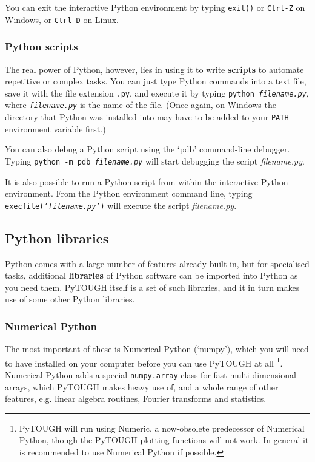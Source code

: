 You can exit the interactive Python environment by typing \texttt{exit()} or \texttt{Ctrl-Z} on Windows, or \texttt{Ctrl-D} on Linux.

\subsubsection{Python scripts}

The real power of Python, however, lies in using it to write \textbf{scripts} to automate repetitive or complex tasks.  You can just type Python commands into a text file, save it with the file extension \texttt{.py}, and execute it by typing \texttt{python \emph{filename.py}}, where \texttt{\emph{filename.py}} is the name of the file.  (Once again, on Windows the directory that Python was installed into may have to be added to your \texttt{PATH} environment variable first.)

You can also debug a Python script using the `pdb' command-line debugger.  Typing \texttt{python -m pdb \emph{filename.py}} will start debugging the script \emph{filename.py}.

It is also possible to run a Python script from within the interactive Python environment.  From the Python environment command line, typing \texttt{execfile(\emph{'filename.py'})} will execute the script \emph{filename.py}.

\subsection{Python libraries}
\label{pylibraries}

Python comes with a large number of features already built in, but for specialised tasks, additional \textbf{libraries} of Python software can be imported into Python as you need them.  PyTOUGH itself is a set of such libraries, and it in turn makes use of some other Python libraries.

\subsubsection{Numerical Python}

The most important of these is Numerical Python (`numpy'), which you will need to have installed on your computer before you can use PyTOUGH at all \footnote{PyTOUGH will run using Numeric, a now-obsolete predecessor of Numerical Python, though the PyTOUGH plotting functions will not work.  In general it is recommended to use Numerical Python if possible.}.  Numerical Python adds a special \texttt{numpy.array} class for fast multi-dimensional arrays, which PyTOUGH makes heavy use of, and a whole range of other features, e.g. linear algebra routines, Fourier transforms and statistics.


